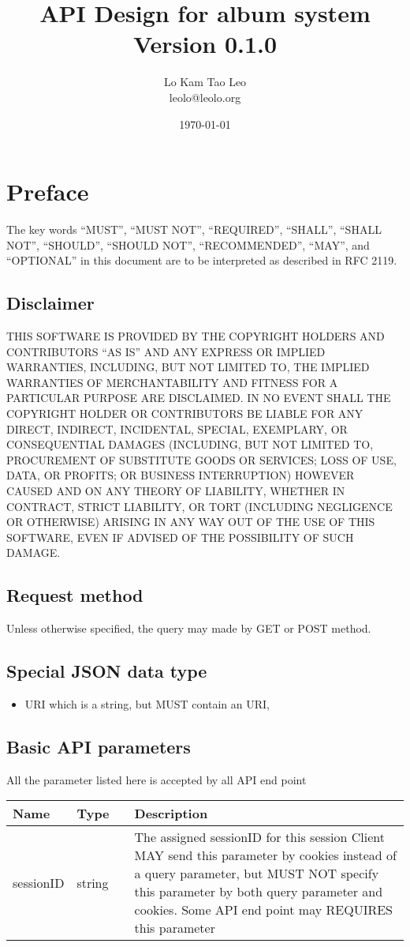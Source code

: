 \documentclass[a4paper,12pt]{report}
\title{API Design for album system Version 0.1.0}
\author{Lo Kam Tao Leo\\leolo@leolo.org}
\date{\today}
\begin{document}
	\maketitle
	\tableofcontents
	\chapter{Preface}
	The key words ``MUST'', ``MUST NOT'', ``REQUIRED'', ``SHALL'', ``SHALL
	NOT'', ``SHOULD'', ``SHOULD NOT'', ``RECOMMENDED'',  ``MAY'', and
	``OPTIONAL'' in this document are to be interpreted as described in
	RFC 2119.
	\section{Disclaimer}
	THIS SOFTWARE IS PROVIDED BY THE COPYRIGHT HOLDERS AND CONTRIBUTORS ``AS IS''
	AND ANY EXPRESS OR IMPLIED WARRANTIES, INCLUDING, BUT NOT LIMITED TO, THE
	IMPLIED WARRANTIES OF MERCHANTABILITY AND FITNESS FOR A PARTICULAR PURPOSE ARE
	DISCLAIMED. IN NO EVENT SHALL THE COPYRIGHT HOLDER OR CONTRIBUTORS BE LIABLE
	FOR ANY DIRECT, INDIRECT, INCIDENTAL, SPECIAL, EXEMPLARY, OR CONSEQUENTIAL
	DAMAGES (INCLUDING, BUT NOT LIMITED TO, PROCUREMENT OF SUBSTITUTE GOODS OR
	SERVICES; LOSS OF USE, DATA, OR PROFITS; OR BUSINESS INTERRUPTION) HOWEVER
	CAUSED AND ON ANY THEORY OF LIABILITY, WHETHER IN CONTRACT, STRICT LIABILITY,
	OR TORT (INCLUDING NEGLIGENCE OR OTHERWISE) ARISING IN ANY WAY OUT OF THE USE
	OF THIS SOFTWARE, EVEN IF ADVISED OF THE POSSIBILITY OF SUCH DAMAGE.
	\section{Request method}
	Unless otherwise specified, the query may made by GET or POST method.
	\section{Special JSON data type}
	\begin{itemize}
		\item \label{type:URI}URI which is a string, but MUST contain an URI, 
	\end{itemize}
	\section{Basic API parameters}
	All the parameter listed here is accepted by all API end point
	
	\begin{tabular}{|l|ll|p{10cm}|}
		\hline
		Name & Type & & Description\\\hline
		sessionID & string &  & The assigned sessionID for this session\newline
		Client MAY send this parameter by cookies instead of a query parameter, but MUST NOT specify this parameter by both query parameter and cookies.\newline
		Some API end point may REQUIRES this parameter\\\hline
	\end{tabular}
	
\end{document}
